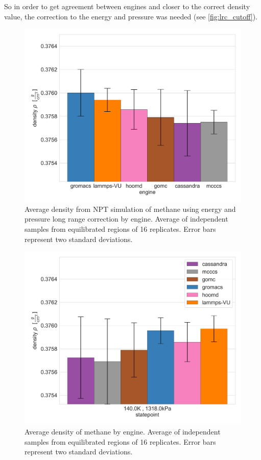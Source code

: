So in order to get agreement between engines and closer to the correct density value, the correction to the energy and pressure was needed (see \autoref{fig:lrc_cutoff}).
\begin{figure}[h!]
    \centering
    \includegraphics[width=0.8\linewidth,keepaspectratio]{figures/rep_study/lrc_cutoff.png}
    \caption{Average density from NPT simulation of methane using energy and pressure long range correction by engine. Average of independent samples from equilibrated regions of 16 replicates. Error bars represent two standard deviations.}\label{fig:lrc_cutoff}
\end{figure}

\begin{figure}[h!]
    \centering
    \includegraphics[width=0.8\linewidth,keepaspectratio]{figures/rep_study/methaneUA_summary.png}
    \caption{Average density of methane by engine. Average of independent samples from equilibrated regions of 16 replicates. Error bars represent two standard deviations.}\label{fig:methane_density}
\end{figure}

